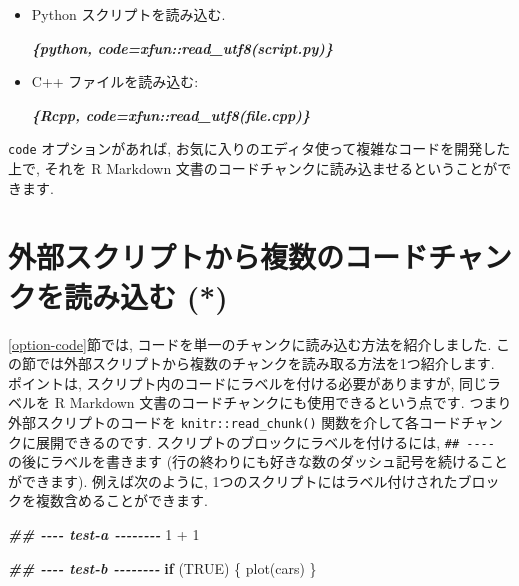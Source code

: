\documentclass[
  11pt,
  lualatex,ja=standard,jafont=noto]{bxjsreport}
\newenvironment{Shaded}{\begin{snugshade}}{\end{snugshade}}
\newcommand{\ConstantTok}[1]{\textcolor[rgb]{0.00,0.00,0.00}{#1}}
\newcommand{\ControlFlowTok}[1]{\textcolor[rgb]{0.13,0.29,0.53}{\textbf{#1}}}
\newcommand{\DecValTok}[1]{\textcolor[rgb]{0.00,0.00,0.81}{#1}}
\newcommand{\DocumentationTok}[1]{\textcolor[rgb]{0.56,0.35,0.01}{\textbf{\textit{#1}}}}
\newcommand{\FunctionTok}[1]{\textcolor[rgb]{0.00,0.00,0.00}{#1}}
\newcommand{\InformationTok}[1]{\textcolor[rgb]{0.56,0.35,0.01}{\textbf{\textit{#1}}}}
\newcommand{\NormalTok}[1]{#1}
\newcommand{\SpecialCharTok}[1]{\textcolor[rgb]{0.00,0.00,0.00}{#1}}
\begin{document}
\begin{itemize}
\item
  Python スクリプトを読み込む.

\begin{Shaded}
\begin{Highlighting}[]
\InformationTok{\textasciigrave{}\textasciigrave{}\textasciigrave{}\{python, code=xfun::read\_utf8(\textquotesingle{}script.py\textquotesingle{})\}}
\InformationTok{\textasciigrave{}\textasciigrave{}\textasciigrave{}}
\end{Highlighting}
\end{Shaded}
\item
  C++ ファイルを読み込む:

\begin{Shaded}
\begin{Highlighting}[]
\InformationTok{\textasciigrave{}\textasciigrave{}\textasciigrave{}\{Rcpp, code=xfun::read\_utf8(\textquotesingle{}file.cpp\textquotesingle{})\}}
\InformationTok{\textasciigrave{}\textasciigrave{}\textasciigrave{}}
\end{Highlighting}
\end{Shaded}
\end{itemize}

\texttt{code} オプションがあれば, お気に入りのエディタ使って複雑なコードを開発した上で, それを R Markdown 文書のコードチャンクに読み込ませるということができます.

\hypertarget{read-chunk}{%
\section{外部スクリプトから複数のコードチャンクを読み込む (*)}\label{read-chunk}}

\ref{option-code}節では, コードを単一のチャンクに読み込む方法を紹介しました. この節では外部スクリプトから複数のチャンクを読み取る方法を1つ紹介します. ポイントは, スクリプト内のコードにラベルを付ける必要がありますが, 同じラベルを R Markdown 文書のコードチャンクにも使用できるという点です. つまり外部スクリプトのコードを \texttt{knitr::read\_chunk()} 関数を介して各コードチャンクに展開できるのです. スクリプトのブロックにラベルを付けるには, \texttt{\#\# -\/-\/-\/-} の後にラベルを書きます (行の終わりにも好きな数のダッシュ記号を続けることができます). 例えば次のように, 1つのスクリプトにはラベル付けされたブロックを複数含めることができます.

\begin{Shaded}
\begin{Highlighting}[]
\DocumentationTok{\#\# {-}{-}{-}{-} test{-}a {-}{-}{-}{-}{-}{-}{-}{-}}
\DecValTok{1} \SpecialCharTok{+} \DecValTok{1}

\DocumentationTok{\#\# {-}{-}{-}{-} test{-}b {-}{-}{-}{-}{-}{-}{-}{-}}
\ControlFlowTok{if}\NormalTok{ (}\ConstantTok{TRUE}\NormalTok{) \{}
  \FunctionTok{plot}\NormalTok{(cars)}
\NormalTok{\}}
\end{Highlighting}
\end{Shaded}
\end{document}
